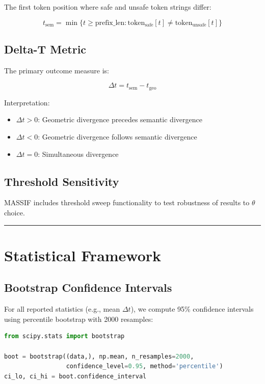 \documentclass[12pt,a4paper]{article}
\begin{document}
The first token position where safe and unsafe token strings differ:

\begin{equation}
t_{\text{sem}} = \min\{t \geq \text{prefix\_len} : \text{token}_{\text{safe}}[t] \neq \text{token}_{\text{unsafe}}[t]\}
\end{equation}

\subsection{Delta-T Metric}

The primary outcome measure is:

\begin{equation}
\Delta t = t_{\text{sem}} - t_{\text{geo}}
\end{equation}

Interpretation:
\begin{itemize}
    \item \(\Delta t > 0\): Geometric divergence precedes semantic divergence
    \item \(\Delta t < 0\): Geometric divergence follows semantic divergence
    \item \(\Delta t = 0\): Simultaneous divergence
\end{itemize}

\subsection{Threshold Sensitivity}

MASSIF includes threshold sweep functionality to test robustness of results to \(\theta\) choice.

\medskip
\hrule
\medskip

\section{Statistical Framework}

\subsection{Bootstrap Confidence Intervals}

For all reported statistics (e.g., mean \(\Delta t\)), we compute 95\% confidence intervals using percentile bootstrap with 2000 resamples:

\begin{lstlisting}[language=Python, style=pythonstyle, caption={Bootstrap CI}, label=lst:bootstrap]
from scipy.stats import bootstrap

boot = bootstrap((data,), np.mean, n_resamples=2000,
                 confidence_level=0.95, method='percentile')
ci_lo, ci_hi = boot.confidence_interval
\end{lstlisting}
\end{document}
